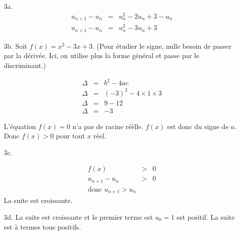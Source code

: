 \documentclass[11pt]{article}
\begin{document}
\begin{multicols}{2}
\begin{enumerate}
  \item[3a.] 
    \begin{eqnarray*}
      u_{n+1} - u_n &=& u_{n}^{2} - 2u_n + 3 - u_n\\
      u_{n+1} - u_n &=& u_{n}^{2} - 3u_n + 3
    \end{eqnarray*}
    
  \item[3b.] Soit $f(x) = x^2 -3x + 3$.
    (Pour étudier le signe, nulle besoin de passer par la dérivée. Ici, on utilise plus la forme général et passe par le discriminant.)
    
    \begin{eqnarray*}
      \Delta &=& b^2 - 4ac \\
      \Delta &=& (-3)^2 - 4 \times 1 \times 3 \\
      \Delta &=& 9 - 12 \\
      \Delta &=& -3
    \end{eqnarray*}
    
    L'équation $f(x) = 0$ n'a pas de racine réèlle. $f(x)$ est donc du signe de $a$. 
    Donc $f(x) > 0$ pour tout $x$ réel.
    
  \item[3c.]
    
    \begin{eqnarray*}
      f(x) &>& 0 \\
      u_{n+1} - u_n &>& 0 \\
      \text{donc } u_{n+1} > u_n 
    \end{eqnarray*}
    La suite est croissante.
    
  \item[3d.] La suite est croissante et le premier terme est $u_0 = 1$ est positif. La suite est à termes tous positifs.
    
  \end{enumerate}
\end{multicols}

\newpage
\end{document}

